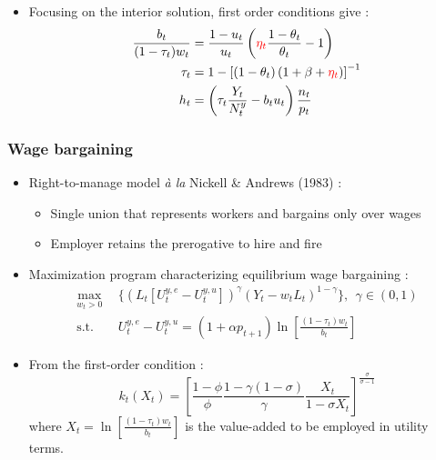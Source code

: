 \documentclass[usenames,dvipsnames]{beamer}
\begin{document}
	\begin{frame}
		\begin{itemize}
			\item Focusing on the interior solution, first order conditions give :
			\begin{align*}
			\frac{b_t}{(1-\tau_t)w_t} &= \frac{1-u_t}{u_t} \left(\textcolor{red}{\eta_t}\frac{1-\theta_t}{\theta_t}- 1\right)\\
			\tau_t &= 1 - \left[\left(1-\theta_t\right)\left(1+\beta+\textcolor{red}{\eta_t}\right)\right]^{-1}\\
			h_t &= \left(\tau_t \frac{Y_t}{N_t^y} - b_t u_t\right)\frac{n_t}{p_t}
			\end{align*}
		\end{itemize}
	\end{frame}	
	\begin{frame}\frametitle{Wage bargaining}
		\begin{itemize}
			\item Right-to-manage model \textit{à la} Nickell \& Andrews (1983) :
			\begin{itemize}
				\item Single union that represents workers and bargains only over wages
				\item Employer retains the prerogative to hire and fire
			\end{itemize}
		\end{itemize}
		\vspace{1em}
		\begin{itemize}
			\item Maximization program characterizing equilibrium wage bargaining :
			\begin{align*}
			\max_{w_t>0} ~~ &\lbrace \left(L_t[U^{y,e}_t - U^{y,u}_t]\right)^\gamma \left(Y_t-w_tL_t\right)^{1-\gamma}\rbrace,~~\gamma\in(0,1)\\
			\text{s.t.} ~~ &U_t^{y,e} - U_t^{y,u} = (1+\alpha p_{t+1})\ln\left[\frac{(1-\tau_t)w_t}{b_t}\right]
			\end{align*}
		\end{itemize}				
	\end{frame}
	\begin{frame}
		\begin{itemize}
			\item From the first-order condition :
			\begin{equation*}
			k_t(X_t) = \left[\frac{1-\phi}{\phi}\frac{1-\gamma(1-\sigma)}{\gamma}\frac{X_t}{1-\sigma X_t}\right]^{\frac{\sigma}{\sigma-1}}
			\end{equation*}
			where $X_t=\ln\left[\frac{(1-\tau_t)w_t}{b_t}\right]$ is the value-added to be employed in utility terms.
		\end{itemize}
	\end{frame}
\end{document}
